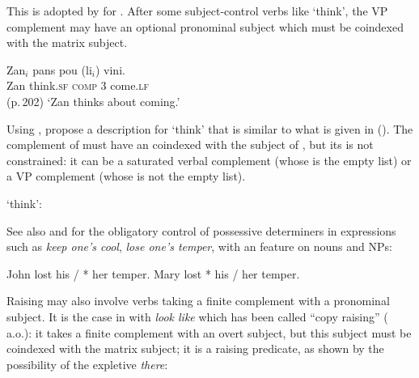 \documentclass[output=paper
	        ,collection
	        ,collectionchapter
 	        ,biblatex
                ,babelshorthands
                ,newtxmath
                ,draftmode
                ,colorlinks, citecolor=brown
]{langscibook}
\begin{document}
This is adopted by \citet{HenriandLaurens2011}\addpages for .  After some subject-control verbs
like  `think', the VP complement may have an optional pronominal subject which must be coindexed with the matrix subject. 

\ea
\gll Zan$_{i}$ pans              pou           (li$_{i}$)            vini.\\
     Zan       think.\textsc{sf} \textsc{comp} 3\SG{} come.\textsc{lf}  \\\hfill(p.\,202)
\glt `Zan thinks about coming.'
\z

Using \xarg, \citet[]{HenriandLaurens2011} propose a description for  `think' that is
similar to what is given in (). The complement of
 must have an \xarg coindexed with the subject of , but its \subjl is not
constrained: it can be a saturated verbal complement (whose \subjv is the empty list) or a VP
complement (whose \subjv is not the empty list).

\ea
\label{ex-pans-Maritian}
 `think':\\
\z

 See also  and  for the obligatory control of possessive determiners in  expressions such as \emph{keep one's cool}, \emph{lose one's temper}, with an \xarg feature on nouns and NPs:
\begin{exe}
\ex \begin{xlist}
\ex John lost his / * her temper.
\ex Mary lost * his / her temper.
\end{xlist}
\end{exe}

Raising may also involve verbs taking a finite complement with a pronominal subject. It is the case in  with \emph{look like} which has been called ``copy raising'' (\citealp{Rogers74a-u,Hornstein99a-u} a.o.): it takes a finite complement with an overt subject, but this subject must be coindexed with the matrix subject; it is a raising predicate, as shown by the possibility of the expletive \emph{there}:
\end{document}
